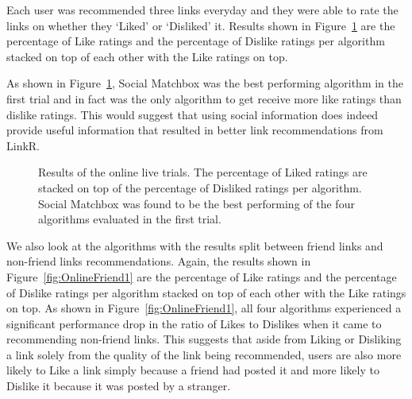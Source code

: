 Each user was recommended three links everyday and they were able to rate the links on whether they `Liked' or `Disliked' it. Results shown in Figure~\ref{fig:OnlineResult1} are the percentage of Like ratings and the percentage of Dislike ratings per algorithm stacked on top of each other with the Like ratings on top. 

As shown in Figure~\ref{fig:OnlineResult1}, Social Matchbox was the best performing algorithm in the first trial and in fact was the only algorithm to get receive more like ratings than dislike ratings. This would suggest that using social information does indeed provide useful information that resulted in better link recommendations from LinkR.

\begin{figure}[t!]
\centering
{}
\caption{Results of the online live trials. The percentage of Liked ratings are stacked on top of the percentage of Disliked ratings per algorithm. Social Matchbox was found to be the best performing of the four algorithms evaluated in the first trial.}
\label{fig:OnlineResult1}
\end{figure}

We also look at the algorithms with the results split between friend links and non-friend links recommendations. Again, the results shown in Figure~\ref{fig:OnlineFriend1} are the percentage of Like ratings and the percentage of Dislike ratings per algorithm stacked on top of each other with the Like ratings on top. As shown in Figure~\ref{fig:OnlineFriend1}, all four algorithms experienced a significant performance drop in the ratio of Likes to Dislikes when it came to recommending non-friend links. This suggests that aside from Liking or Disliking a link solely from the quality of the link being recommended, users are also more likely to Like a link simply because a friend had posted it and more likely to Dislike it because it was posted by a stranger.

